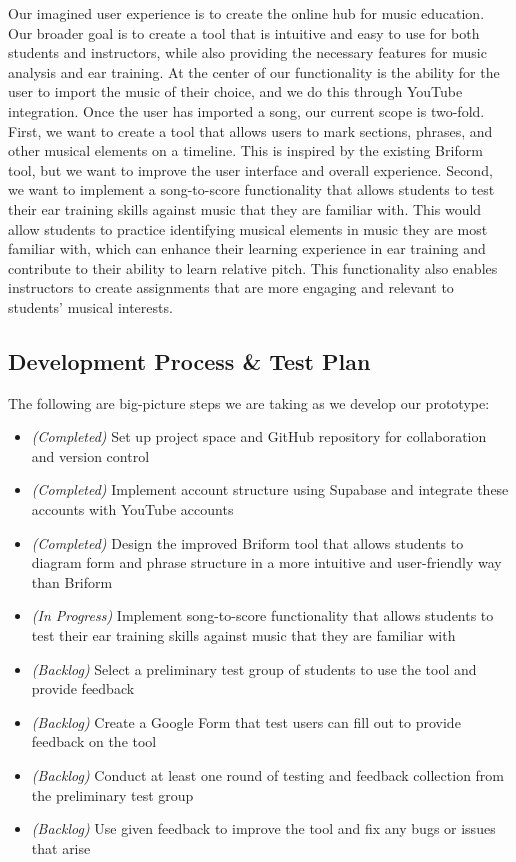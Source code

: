 \documentclass[12pt, letterpaper]{article}
\begin{document}
Our imagined user experience is to create the online hub for music education.  Our broader goal is to create a tool that is intuitive and easy to use for both students and instructors, while also providing the necessary features for music analysis and ear training.  At the center of our functionality is the ability for the user to import the music of their choice, and we do this through YouTube integration.  Once the user has imported a song, our current scope is two-fold.  First, we want to create a tool that allows users to mark sections, phrases, and other musical elements on a timeline.  This is inspired by the existing Briform tool, but we want to improve the user interface and overall experience.  Second, we want to implement a song-to-score functionality that allows students to test their ear training skills against music that they are familiar with.  This would allow students to practice identifying musical elements in music they are most familiar with, which can enhance their learning experience in ear training and contribute to their ability to learn relative pitch.  This functionality also enables instructors to create assignments that are more engaging and relevant to students' musical interests.

\subsection*{Development Process \& Test Plan}
The following are big-picture steps we are taking as we develop our prototype:
\begin{itemize}
	\item[] \textit{(Completed)} Set up project space and GitHub repository for collaboration and version control
	\item[] \textit{(Completed)} Implement account structure using Supabase and integrate these accounts with YouTube accounts
	\item[] \textit{(Completed)} Design the improved Briform tool that allows students to diagram form and phrase structure in a more intuitive and user-friendly way than Briform
	\item[] \textit{(In Progress)} Implement song-to-score functionality that allows students to test their ear training skills against music that they are familiar with
	\item[] \textit{(Backlog)} Select a preliminary test group of students to use the tool and provide feedback
	\item[] \textit{(Backlog)} Create a Google Form that test users can fill out to provide feedback on the tool
	\item[] \textit{(Backlog)} Conduct at least one round of testing and feedback collection from the preliminary test group
	\item[] \textit{(Backlog)} Use given feedback to improve the tool and fix any bugs or issues that arise
\end{itemize}
\end{document}
